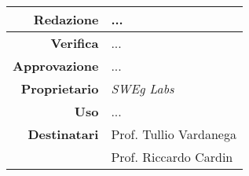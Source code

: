 \begin{center}
\begin{tabular}{r|l}
    \textbf{Redazione} & ... \\
    \hline
    \textbf{Verifica} & ... \\
    \hline
    \textbf{Approvazione} & ... \\
    \hline
    \textbf{Proprietario} & \emph{SWEg Labs} \\
    \hline
    \textbf{Uso} & ... \\
    \hline
    \textbf{Destinatari} & Prof. Tullio Vardanega \\
                         & Prof. Riccardo Cardin \\
\end{tabular}
\end{center}
